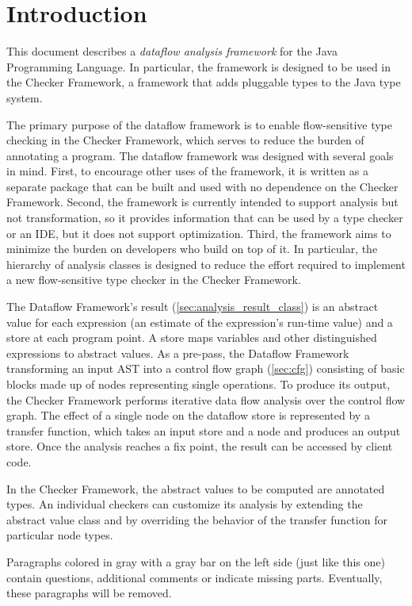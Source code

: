 
\section{Introduction}

This document describes a \emph{dataflow analysis framework} for the Java Programming Language.
In particular, the framework is designed to be used in the Checker Framework, a framework
that adds pluggable types to the Java type system.

The primary purpose of the dataflow framework is to enable flow-sensitive type checking in the Checker Framework, which serves to reduce the burden of annotating a program.  The dataflow framework was designed with several goals in mind.  First, to encourage other uses of the framework, it is written as a separate package that can be built and used with no dependence on the Checker Framework.  Second, the framework is currently intended to support analysis but not transformation, so it provides information that can be used by a type checker or an IDE, but it does not support optimization.  Third, the framework aims to minimize the burden on developers who build on top of it.  In particular, the hierarchy of analysis classes is designed to reduce the effort required to implement a new flow-sensitive type checker in the Checker Framework.

The Dataflow Framework's result (\autoref{sec:analysis_result_class}) is an
abstract value for each expression
(an estimate of the expression's run-time value) and a store at each
program point.  A store maps variables and other distinguished expressions
to abstract values.  As a pre-pass, the Dataflow Framework transforming an
input AST into a control flow graph (\autoref{sec:cfg}) consisting of basic
blocks made up of
nodes representing single operations.  To produce its output, the Checker
Framework performs iterative data flow analysis over the control flow
graph.  The effect of a single node on the dataflow store is represented by
a transfer function, which takes an input store and a node and produces an
output store.  Once the analysis reaches a fix point, the result can be
accessed by client code.

In the Checker Framework, the abstract values to be computed are annotated
types.  An individual checkers can customize its analysis by extending the
abstract value class and by overriding the behavior of the transfer
function for particular node types.

\begin{workinprogress}    
    Paragraphs colored in gray with a gray bar on the left side (just like this one)
    contain questions, additional comments or indicate missing parts. Eventually, these
    paragraphs will be removed.
\end{workinprogress}





